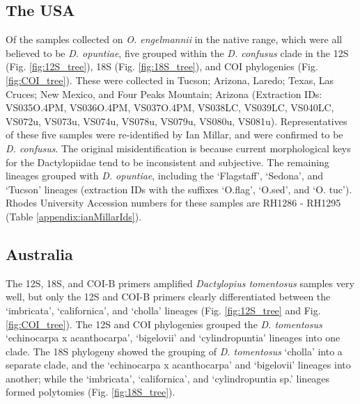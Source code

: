 \subsection{The USA}
Of the samples collected on \textit{O. engelmannii} in the native range, which were all believed to be \textit{D. opuntiae}, five grouped within the \textit{D. confusus} clade in the 12S (Fig. \ref{fig:12S_tree}), 18S (Fig. \ref{fig:18S_tree}), and COI  phylogenies (Fig. \ref{fig:COI_tree}). These were collected in Tucson; Arizona, Laredo; Texas, Las Cruces; New Mexico, and Four Peaks Mountain; Arizona (Extraction IDs: VS035O.4PM, VS036O.4PM, VS037O.4PM, VS038LC, VS039LC, VS040LC, VS072u, VS073u, VS074u, VS078u, VS079u, VS080u, VS081u). Representatives of these five samples were re-identified by Ian Millar, and were confirmed to be \textit{D. confusus}. The original misidentification is because current morphological keys for the Dactylopiidae tend to be inconsistent and subjective. The remaining lineages grouped with \textit{D. opuntiae}, including the `Flagstaff', `Sedona', and `Tucson' lineages (extraction IDs with the suffixes `O.flag', `O.sed', and `O. tuc'). Rhodes University Accession numbers for these samples are RH1286 - RH1295 (Table \ref{appendix:ianMillarIds}).

\subsection{Australia}
The 12S, 18S, and COI-B primers amplified \textit{Dactylopius tomentosus} samples very well, but only the 12S and COI-B primers clearly differentiated between the `imbricata', `californica', and `cholla' lineages (Fig. \ref{fig:12S_tree} and Fig. \ref{fig:COI_tree}).
The 12S and COI phylogenies grouped the \textit{D. tomentosus} `echinocarpa x acanthocarpa', `bigelovii' and `cylindropuntia' lineages into one clade. The 18S phylogeny showed the grouping of \textit{D. tomentosus} `cholla' into a separate clade, and the `echinocarpa x acanthocarpa' and `bigelovii' lineages into another; while the `imbricata', `californica', and `cylindropuntia sp.' lineages formed polytomies (Fig. \ref{fig:18S_tree}). 

